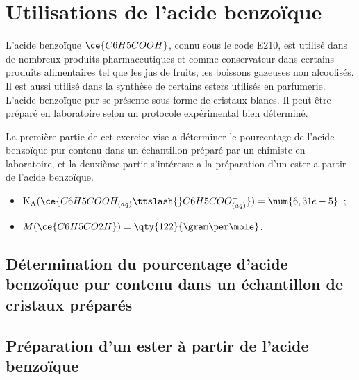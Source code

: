 \section{Utilisations de l'acide benzoïque}
L'acide benzoïque $\ce{C6H5COOH}$, connu sous le code E210, est utilisé dans de
nombreux produits pharmaceutiques et comme conservateur dans certains produits
alimentaires tel que les jus de fruits, les boissons gazeuses non alcoolisés. Il
est aussi utilisé dans la synthèse de certains esters utilisés en parfumerie.
L'acide benzoïque pur se présente sous forme de cristaux blancs. Il peut être
préparé en laboratoire selon un protocole expérimental bien déterminé.

La première partie de cet exercice vise a déterminer le pourcentage de l'acide
benzoïque pur contenu dans un échantillon préparé par un chimiste en
laboratoire, et la deuxième partie s'intéresse a la préparation d'un ester a
partir de l'acide benzoïque.


\begin{donnees}
    \begin{itemize}
        \item $\mathrm{K_{A}}(\ce{C6H5COOH_{(aq)}\ttslash{}C6H5COO^{-}_{(aq)}})=
              \num{6,31e-5}$~;
        \item $M(\ce{C6H5CO2H})=\qty{122}{\gram\per\mole}$.
    \end{itemize}
\end{donnees}

\subsection{Détermination du pourcentage d'acide benzoïque pur contenu dans un
échantillon de cristaux préparés}


\subsection{Préparation d'un ester à partir de l'acide benzoïque}

